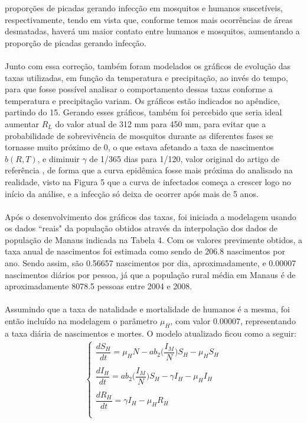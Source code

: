 proporções de picadas gerando infecção em mosquitos e humanos suscetíveis, 
respectivamente, tendo em vista que, conforme temos mais ocorrências de áreas 
desmatadas, haverá um maior contato entre humanos e mosquitos, aumentando a 
proporção de picadas gerando infecção. 
\\\\
Junto com essa correção, também 
foram modelados os gráficos de evolução das taxas utilizadas, em função 
da temperatura e precipitação, ao invés do tempo, para que fosse 
possível analisar o comportamento dessas taxas conforme a temperatura e 
precipitação variam. Os gráficos estão indicados no apêndice, partindo do 15. 
Gerando esses gráficos, também foi percebido que seria ideal aumentar $R_L$ 
do valor atual de 312 mm para 450 mm, para evitar que a probabilidade de 
sobrevivência de mosquitos durante as diferentes fases se 
tornasse muito próximo de 0, o que estava afetando a taxa de 
nascimentos $b(R,T)$, e diminuir $\gamma$ de 1/365 dias para 1/120, valor original
do artigo de referência \cite{Parham2010}, de forma que a curva epidêmica fosse mais
próxima do analisado na realidade, visto na Figura 5 que a curva de infectados começa
a crescer logo no início da análise, e a infecção só deixa de ocorrer após mais de
5 anos.
\\\\
Após o desenvolvimento dos gráficos das taxas, foi iniciada a modelagem usando os dados 
``reais" da população obtidos através da interpolação dos dados de população de Manaus indicada na Tabela 4.
Com os valores previmente obtidos, a taxa anual de nascimentos foi estimada como sendo de 206.8 
nascimentos por ano. Sendo assim, são 0.56657 nascimentos por dia, aproximadamente, e 0.00007 nascimentos
diários por pessoa, já que a população rural média em Manaus é de aproximadamente 8078.5 pessoas entre 2004 e 2008.
\\\\
Assumindo que a taxa de natalidade e mortalidade de humanos é a mesma, foi então incluído na 
modelagem o parâmetro $\mu_H$, com valor 0.00007, representando a taxa diária de 
nascimentos e mortes. O modelo atualizado ficou como a seguir:
\begin{gather*}
\begin{cases}
\dfrac{dS_H}{dt} = \mu_HN-ab_2\bigg(\dfrac{I_M}{N}\bigg)S_H - \mu_HS_H\\
\\
\dfrac{dI_H}{dt} = ab_2\bigg(\dfrac{I_M}{N}\bigg)S_H-\gamma I_H - \mu_HI_H\\
\\
\dfrac{dR_H}{dt} = \gamma I_H - \mu_HR_H\\
\\
\end{cases}
\end{gather*}

